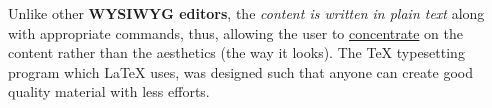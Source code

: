 \documentclass{article}
\begin{document}
	Unlike other \textbf{WYSIWYG editors}, the \emph{content is written in plain text} along with appropriate commands, thus, allowing the user to \underline{concentrate} on the content rather than the aesthetics (the way it looks). The TeX typesetting program which LaTeX uses, was designed such that anyone can create good quality material with less efforts.
\end{document}
